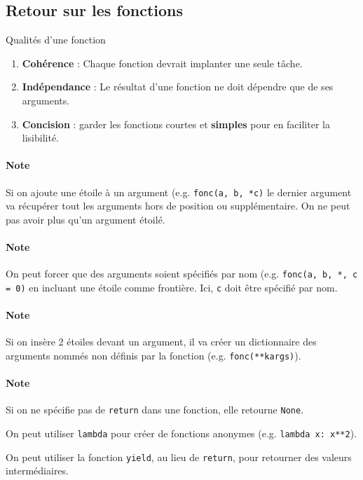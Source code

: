 \documentclass[10pt, french]{article}
\begin{document}
\begin{multicols*}{2}
\newpage	
\section{Retour sur les fonctions}
Qualités d'une fonction
\begin{enumerate}[label = \circled{\arabic*}{trueblue}]
	\item	\textbf{Cohérence} : Chaque fonction devrait implanter une seule tâche.
	\item	\textbf{Indépendance} : Le résultat d'une fonction ne doit dépendre que de ses arguments.
	\item	\textbf{Concision} : garder les fonctions courtes et \textbf{simples} pour en faciliter la lisibilité.
\end{enumerate}

\paragraph{Note}	Si on ajoute une étoile à un argument (e.g. \texttt{fonc(a, b, *c)} le dernier argument va récupérer tout les arguments hors de position ou supplémentaire. On ne peut pas avoir plus qu'un argument étoilé.

\paragraph{Note}	On peut forcer que des arguments soient spécifiés par nom (e.g. \texttt{fonc(a, b, *, c = 0)} en incluant une étoile comme frontière. Ici, \texttt{c} doit être spécifié par nom.

\paragraph{Note}	Si on insère 2 étoiles devant un argument, il va créer un dictionnaire des arguments nommés non définis par la fonction (e.g. \texttt{fonc(**kargs)}).

\paragraph{Note}	Si on ne spécifie pas de \texttt{return} dans une fonction, elle retourne \texttt{None}.

\bigskip

On peut utiliser \texttt{lambda} pour créer de fonctions anonymes (e.g. \texttt{lambda x: x**2}).

\bigskip

On peut utiliser la fonction \texttt{yield}, au lieu de \texttt{return}, pour retourner des valeurs intermédiaires.



\end{multicols*}
\end{document}
